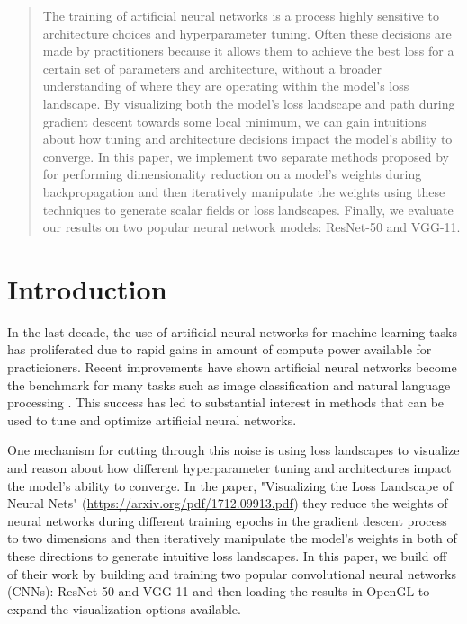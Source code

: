 \documentclass{acmsiggraph}
\begin{document}
\begin{abstract}

	\copyrightspace
    The training of artificial neural networks is a process highly sensitive to architecture choices and hyperparameter tuning. Often these decisions are made by practitioners because it allows them to achieve the best loss for a certain set of parameters and architecture, without a broader understanding of where they are operating within the model's loss landscape. By visualizing both the model's loss landscape and path during gradient descent towards some local minimum, we can gain intuitions about how tuning and architecture decisions impact the model's ability to converge. In this paper, we implement two separate methods proposed by \cite{NEURIPS2018_a41b3bb3} for performing dimensionality reduction on a model's weights during backpropagation and then iteratively manipulate the weights using these techniques to generate scalar fields or loss landscapes. Finally, we evaluate our results on two popular neural network models: ResNet-50 and VGG-11.
	
\end{abstract}

\keywordlist

\section{Introduction}
\label{sec:intro}

In the last decade, the use of artificial neural networks for machine learning tasks has proliferated due to rapid gains in amount of compute power available for practicioners. Recent improvements have shown artificial neural networks become the benchmark for many tasks such as image classification and natural language processing \cite{ABIODUN2018e00938}. This success has led to substantial interest in methods that can be used to tune and optimize artificial neural networks. 

One mechanism for cutting through this noise is using loss landscapes to visualize and reason about how different hyperparameter tuning and architectures impact the model's ability to converge. In the paper, "Visualizing the Loss Landscape of Neural Nets" (\url{https://arxiv.org/pdf/1712.09913.pdf}) they reduce the weights of neural networks during different training epochs in the gradient descent process to two dimensions and then iteratively manipulate the model's weights in both of these directions to generate intuitive loss landscapes. In this paper, we build off of their work by building and training two popular convolutional neural networks (CNNs): ResNet-50 and VGG-11 and then loading the results in OpenGL to expand the visualization options available.
\end{document}
